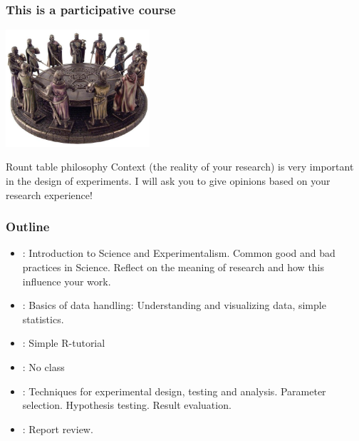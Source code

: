 \documentclass{beamer}
\begin{document}
\begin{frame}
  \frametitle{This is a participative course}
  \begin{center}
    \includegraphics[width=0.4\textwidth]{img/roundtable}
  \end{center}
  \begin{block}{Rount table philosophy}
    Context (the reality of your research) is very important in the design of experiments. I will
     ask you to give opinions based on your
    research experience!
  \end{block}
\end{frame}

\begin{frame}
  \frametitle{Outline}
  \begin{itemize}
  \item {}: Introduction to Science and
    Experimentalism. Common good and bad practices in Science. Reflect
    on the meaning of research and how this influence your work.
  \item {}: Basics of data handling: Understanding
    and visualizing data, simple statistics.
  \item {}: Simple R-tutorial
    \medskip
  \item {}: \alert{No class}
    \medskip
  \item {}: Techniques for experimental design,
    testing and analysis. Parameter selection. Hypothesis
    testing. Result evaluation.
  \item {}: Report review.
  \end{itemize}
\end{frame}
\end{document}
